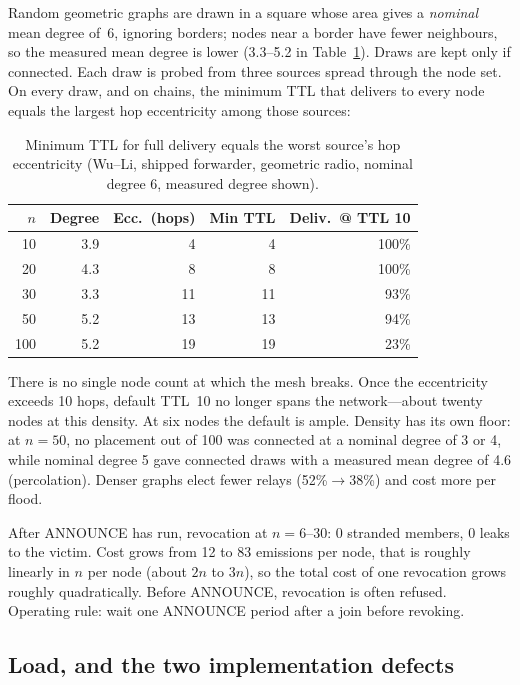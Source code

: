 \documentclass[conference,10pt]{IEEEtran}
\begin{document}
Random geometric graphs are drawn in a square whose area gives a
\emph{nominal} mean degree of~6, ignoring borders; nodes near a border
have fewer neighbours, so the measured mean degree is lower (3.3--5.2 in
Table~\ref{tab:ttl}). Draws are kept only if connected. Each draw is
probed from three sources spread through the node set. On every draw, and
on chains, the minimum TTL that delivers to every node equals the largest
hop eccentricity among those sources:

\begin{table}[t]
\centering
\caption{Minimum TTL for full delivery equals the worst source's hop
  eccentricity (Wu--Li, shipped forwarder, geometric radio, nominal
  degree 6, measured degree shown).}
\label{tab:ttl}
\begin{tabular}{@{}rrrrr@{}}
\toprule
$n$ & Degree & Ecc.\ (hops) & Min TTL & Deliv.\ @ TTL 10 \\
\midrule
10 & 3.9 & 4 & 4 & 100\% \\
20 & 4.3 & 8 & 8 & 100\% \\
30 & 3.3 & 11 & 11 & 93\% \\
50 & 5.2 & 13 & 13 & 94\% \\
100 & 5.2 & 19 & 19 & 23\% \\
\bottomrule
\end{tabular}
\end{table}

There is no single node count at which the mesh breaks. Once the
eccentricity exceeds 10 hops, default TTL~10 no longer spans the
network---about twenty nodes at this density. At six nodes the default is
ample. Density has its own floor: at $n=50$, no placement out of 100 was
connected at a nominal degree of 3 or 4, while nominal degree 5 gave
connected draws with a measured mean degree of 4.6 (percolation). Denser
graphs elect fewer relays (52\%$\to$38\%) and cost more per flood.

After ANNOUNCE has run, revocation at $n=6$--$30$: 0 stranded members, 0
leaks to the victim. Cost grows from 12 to 83 emissions per node, that is
roughly linearly in $n$ per node (about $2n$ to $3n$), so the total cost
of one revocation grows roughly quadratically. Before ANNOUNCE,
revocation is often refused. Operating rule: wait one ANNOUNCE period
after a join before revoking.

\subsection{Load, and the two implementation defects}
\label{sec:defects}
\end{document}
